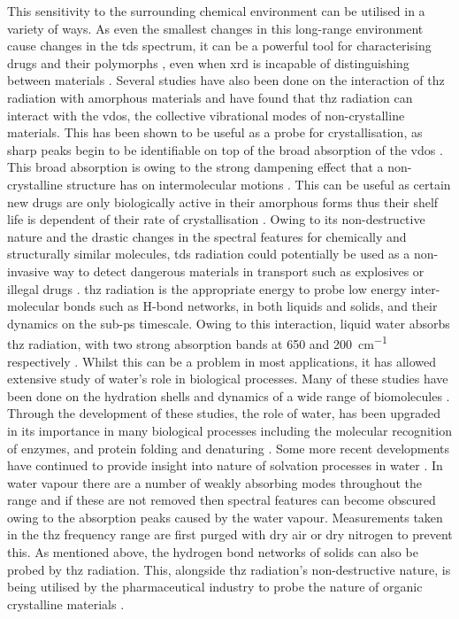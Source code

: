 This sensitivity to the surrounding chemical environment can be utilised in a variety of ways. As even the smallest changes in this long\nobreakdash-range environment cause changes in the \acrshort{tds} spectrum, it can be a powerful tool for characterising drugs and their polymorphs \cite{Wang2022}, even when \acrfull{xrd} is incapable of distinguishing between materials \cite{Zeitler2016, Song2021, Druzbicki2015}. Several studies have also been done on the interaction of \acrshort{thz} radiation with amorphous materials and have found that \acrshort{thz} radiation can interact with the \acrfull{vdos}, the collective vibrational modes of non-crystalline materials. This has been shown to be useful as a probe for crystallisation, as sharp peaks begin to be identifiable on top of the broad absorption of the \acrshort{vdos} \cite{Zeitler2007}. This broad absorption is owing to the strong dampening effect that a non\nobreakdash-crystalline structure has on intermolecular motions \cite{Walther2003}. This can be useful as certain new drugs are only biologically active in their amorphous forms thus their shelf life is dependent of their rate of crystallisation \cite{Shmool2019}. Owing to its non\nobreakdash-destructive nature and the drastic changes in the spectral features for chemically and structurally similar molecules, \acrshort{tds} radiation could potentially be used as a non-invasive way to detect dangerous materials in transport such as explosives or illegal drugs \cite{Davies2008}.
\acrshort{thz} radiation is the appropriate energy to probe low energy inter\nobreakdash-molecular bonds such as H\nobreakdash-bond networks, in both liquids and solids, and their dynamics on the sub\nobreakdash-ps timescale. Owing to this interaction, liquid water absorbs \acrshort{thz} radiation, with two strong absorption bands at 650 and \SI{200}{cm^{-1}} respectively \cite{Bellissent2016}. Whilst this can be a problem in most applications, it has allowed extensive study of water’s role in biological processes. Many of these studies have been done on the hydration shells and dynamics of a wide range of biomolecules \cite{Laman2008}. Through the development of these studies, the role of water, has been upgraded in its importance in many biological processes including the molecular recognition of enzymes, and protein folding and denaturing \cite{gompf2004}. Some more recent developments have continued to provide insight into nature of solvation processes in water \cite{Stephens2022}. In water vapour there are a number of weakly absorbing modes throughout the  range \cite{Slocum2013} and if these are not removed then spectral features can become obscured owing to the absorption peaks caused by the water vapour. Measurements taken in the \acrshort{thz} frequency range are first purged with dry air or dry nitrogen to prevent this. As mentioned above, the hydrogen bond networks of solids can also be probed by \acrshort{thz} radiation. This, alongside \acrshort{thz} radiation’s non\nobreakdash-destructive nature, is being utilised by the pharmaceutical industry to probe the nature of organic crystalline materials \cite{Zhao2018}. 
